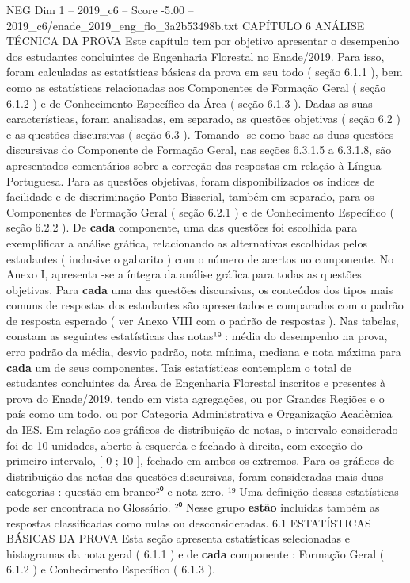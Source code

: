 \begin{textsample}{NEG Dim 1 – 2019\_c6 – Score -5.00 – 2019\_c6/enade\_2019\_eng\_flo\_3a2b53498b.txt}  \label{ex:f1_neg_098}
CAPÍTULO 6 ANÁLISE TÉCNICA DA PROVA Este capítulo tem por objetivo apresentar o desempenho dos estudantes concluintes de Engenharia Florestal no Enade/2019.
Para isso, foram calculadas as estatísticas básicas da prova em seu todo ( seção 6.1.1 ), bem como as estatísticas relacionadas aos Componentes de Formação Geral ( seção 6.1.2 ) e de Conhecimento Específico da Área ( seção 6.1.3 ).
Dadas as suas características, foram analisadas, em separado, as questões objetivas ( seção 6.2 ) e as questões discursivas ( seção 6.3 ).
Tomando -se como base as duas questões discursivas do Componente de Formação Geral, nas seções 6.3.1.5 a 6.3.1.8, são apresentados comentários sobre a correção das respostas em relação à Língua Portuguesa.
Para as questões objetivas, foram disponibilizados os índices de facilidade e de discriminação Ponto-Bisserial, também em separado, para os Componentes de Formação Geral ( seção 6.2.1 ) e de Conhecimento Específico ( seção 6.2.2 ).
De \textbf{cada} componente, uma das questões foi escolhida para exemplificar a análise gráfica, relacionando as alternativas escolhidas pelos estudantes ( inclusive o gabarito ) com o número de acertos no componente.
No Anexo I, apresenta -se a íntegra da análise gráfica para todas as questões objetivas.
Para \textbf{cada} uma das questões discursivas, os conteúdos dos tipos mais comuns de respostas dos estudantes são apresentados e comparados com o padrão de resposta esperado ( ver Anexo VIII com o padrão de respostas ).
Nas tabelas, constam as seguintes estatísticas das notas¹⁹ : média do desempenho na prova, erro padrão da média, desvio padrão, nota mínima, mediana e nota máxima para \textbf{cada} um de seus componentes.
Tais estatísticas contemplam o total de estudantes concluintes da Área de Engenharia Florestal inscritos e presentes à prova do Enade/2019, tendo em vista agregações, ou por Grandes Regiões e o país como um todo, ou por Categoria Administrativa e Organização Acadêmica da IES.
Em relação aos gráficos de distribuição de notas, o intervalo considerado foi de 10 unidades, aberto à esquerda e fechado à direita, com exceção do primeiro intervalo, [ 0 ; 10 ], fechado em ambos os extremos.
Para os gráficos de distribuição das notas das questões discursivas, foram consideradas mais duas categorias : questão em branco²⁰ e nota zero. ¹⁹ Uma definição dessas estatísticas pode ser encontrada no Glossário. ²⁰ Nesse grupo \textbf{estão} incluídas também as respostas classificadas como nulas ou desconsideradas. 6.1 ESTATÍSTICAS BÁSICAS DA PROVA Esta seção apresenta estatísticas selecionadas e histogramas da nota geral ( 6.1.1 ) e de \textbf{cada} componente : Formação Geral ( 6.1.2 ) e Conhecimento Específico ( 6.1.3 ).

\end{textsample}
